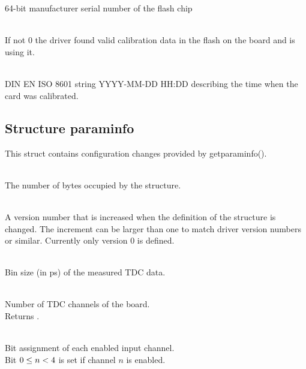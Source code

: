 \\
\\
64-bit manufacturer serial number of the flash chip

\\
If not 0 the driver found valid calibration data in the flash on the board and is using it.\par

\\
DIN EN ISO 8601 string YYYY-MM-DD HH:DD describing the time when the card was calibrated.


\subsection{Structure \prefix param\tu info}
This struct contains configuration changes provided by \textsf{\prefix get\tu param\tu info()}.

\\
The number of bytes occupied by the structure. \par

\\
A version number that is increased when the definition of the structure is changed. The increment can be larger than one to match driver version numbers or similar. Currently only version 0 is defined.\par


\\
Bin size (in ps) of the measured TDC data.


\\
Number of TDC channels of the board.\\
Returns .\par

\\
Bit assignment of each enabled input channel.\\
Bit $0 \leq n < \ifxHPTDC{8}{4}$ is set if channel $n$ is enabled. \par

